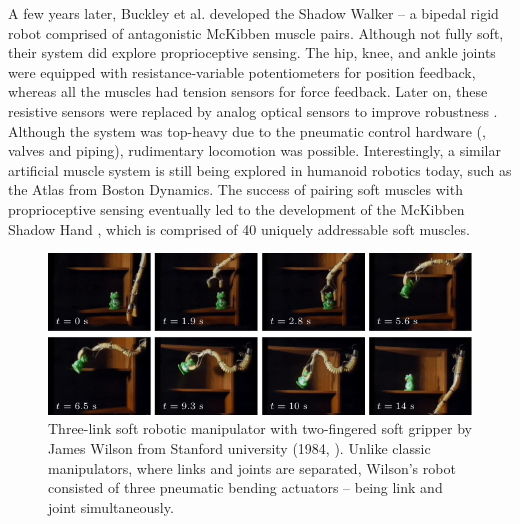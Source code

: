 A few years later, Buckley et al. \cite{Buckley2012} developed the Shadow Walker -- a bipedal rigid robot comprised of antagonistic McKibben muscle pairs. Although not fully soft, their system did explore proprioceptive sensing. The hip, knee, and ankle joints were equipped with resistance-variable potentiometers for position feedback, whereas all the muscles had tension sensors for force feedback. Later on, these resistive sensors were replaced by analog optical sensors to improve robustness \cite{Buckley2012}. Although the system was top-heavy due to the pneumatic control hardware (\eg, valves and piping), rudimentary locomotion was possible. Interestingly, a similar artificial muscle system is still being explored in humanoid robotics today, such as the Atlas from Boston Dynamics. The success of pairing soft muscles with proprioceptive sensing eventually led to the development of the McKibben Shadow Hand \cite{Buckley2012,Gong2022Feb}, which is comprised of 40 uniquely addressable soft muscles.

\begin{figure}[!t]
  \vspace{-2mm}
  \centering
  \includegraphics*[width=\textwidth]{./pdf/thesis-figure-2-6.pdf}
  \caption{Three-link soft robotic manipulator with two-fingered soft gripper by James Wilson from Stanford university (1984, \cite{Wilson2007}). Unlike classic manipulators, where links and joints are separated, Wilson's robot consisted of three pneumatic bending actuators -- being link and joint simultaneously. 
  \label{fig:C0:fist_srm_robot}}
\end{figure}

